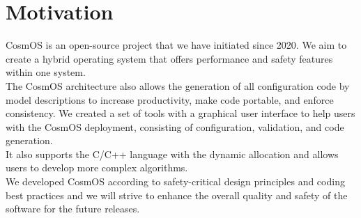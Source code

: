 \section{Motivation}
\indent CosmOS is an open-source project that we have initiated since 2020. We aim to create a hybrid operating system that offers performance and safety features within one system.\\
\indent The CosmOS architecture also allows the generation of all configuration code by model descriptions to increase productivity, make code portable, and enforce consistency. We created a set of tools with a graphical user interface to help users with the CosmOS deployment, consisting of configuration, validation, and code generation. \\
\indent It also supports the C/C++ language with the dynamic allocation and allows users to develop more complex algorithms. \\
\indent We developed CosmOS according to safety-critical design principles and coding best practices and we will strive to enhance the overall quality and safety of the software for the future releases.

